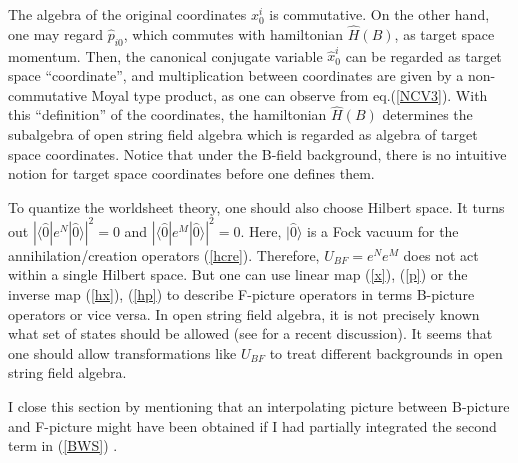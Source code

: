 \documentclass[a4paper,12pt]{article}
\def\bra{\langle}
\def\ket{\rangle}
\begin{document}

The algebra of the original coordinates
$x^i_0$ is commutative. 
On the other hand,
one may regard
$\hat{p}_{i0}$, which commutes with hamiltonian 
$\hat{H}(B)$, 
as target space momentum.
Then, the
canonical conjugate variable
$\hat{x}^i_0$ can be 
regarded as target space ``coordinate'',
and multiplication between coordinates
are given by a
non-commutative Moyal type product, as one can observe
from eq.(\ref{NCV3}).
With this ``definition'' of the coordinates,
the hamiltonian $\hat{H}(B)$ determines
the subalgebra
of open string field algebra
which is regarded as algebra of
target space coordinates.
Notice that under the B-field background,
there is no intuitive notion for
target space coordinates before one defines them.


To quantize the worldsheet theory, one should also
choose Hilbert space.
It turns out
$|\bra \hat{0} | e^N | \hat{0} \ket|^2 = 0$ and
$|\bra \hat{0} | e^M | \hat{0} \ket|^2 = 0$.
Here, $| \hat{0} \ket$ is a Fock vacuum for
the annihilation/creation operators (\ref{hcre}).
Therefore, $U_{BF}=e^N e^M$ does not
 act within a single Hilbert space.
But one can use linear map
(\ref{x}), (\ref{p}) or the inverse map (\ref{hx}), (\ref{hp})
to describe F-picture operators in terms B-picture operators
or vice versa.
In open string field algebra,
it is not precisely known what set of states
should be allowed 
(see \cite{Singular} for a recent discussion).
It seems that
one should allow transformations
like $U_{BF}$ to treat different
backgrounds in
open string field algebra.



I close this section by mentioning that
an interpolating picture 
between B-picture and F-picture might 
have been obtained
if I had
partially integrated the second term in (\ref{BWS})
\cite{NCSW,Pioline,Wilson}.






\end{document}

